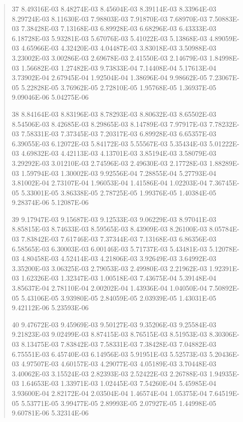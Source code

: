 \documentclass[letterpaper,10pt,english]{sphinxmanual}
\begin{document}
\begin{quote}
\begin{DUlineblock}{0em}
\item[] 37   8.49316E-03  8.48274E-03  8.45604E-03  8.39114E-03  8.33964E-03  8.29724E-03  8.11630E-03  7.98803E-03  7.91870E-03  7.68970E-03  7.50883E-03  7.38428E-03  7.13168E-03  6.89928E-03  6.68296E-03  6.43333E-03  6.18728E-03  5.93281E-03  5.67076E-03  5.41022E-03  5.13868E-03  4.89059E-03  4.65966E-03  4.32420E-03  4.04487E-03  3.83018E-03  3.50988E-03  3.23002E-03  3.00286E-03  2.69678E-03  2.41550E-03  2.14679E-03  1.84998E-03  1.56682E-03  1.27482E-03  9.73833E-04  7.14408E-04  5.17613E-04  3.73902E-04  2.67945E-04  1.92504E-04  1.38696E-04  9.98662E-05  7.23067E-05  5.22828E-05  3.76962E-05  2.72810E-05  1.95768E-05  1.36937E-05  9.09046E-06  5.04275E-06
\item[] 38   8.84164E-03  8.83196E-03  8.78293E-03  8.80632E-03  8.65502E-03  8.54506E-03  8.42685E-03  8.29865E-03  8.14789E-03  7.97917E-03  7.78232E-03  7.58331E-03  7.37345E-03  7.20317E-03  6.89928E-03  6.65357E-03  6.39055E-03  6.12072E-03  5.84172E-03  5.55567E-03  5.35434E-03  5.01222E-03  4.69832E-03  4.42113E-03  4.13701E-03  3.85194E-03  3.58079E-03  3.29292E-03  3.01210E-03  2.74596E-03  2.49630E-03  2.17728E-03  1.88289E-03  1.59794E-03  1.30002E-03  9.92556E-04  7.28855E-04  5.27793E-04  3.81002E-04  2.73107E-04  1.96053E-04  1.41586E-04  1.02203E-04  7.36745E-05  5.33001E-05  3.86338E-05  2.78725E-05  1.99376E-05  1.40384E-05  9.28374E-06  5.12087E-06
\item[] 39   9.17947E-03  9.15687E-03  9.12533E-03  9.06229E-03  8.97041E-03  8.85815E-03  8.74633E-03  8.59565E-03  8.43909E-03  8.26100E-03  8.05784E-03  7.83842E-03  7.61746E-03  7.37344E-03  7.13168E-03  6.86356E-03  6.58565E-03  6.30003E-03  6.00146E-03  5.71737E-03  5.43481E-03  5.12078E-03  4.80458E-03  4.52414E-03  4.21806E-03  3.92649E-03  3.64992E-03  3.35200E-03  3.06325E-03  2.79053E-03  2.49980E-03  2.21962E-03  1.92391E-03  1.62326E-03  1.32347E-03  1.00518E-03  7.43675E-04  5.39148E-04  3.85637E-04  2.78110E-04  2.00202E-04  1.43936E-04  1.04050E-04  7.50892E-05  5.43106E-05  3.93980E-05  2.84059E-05  2.03939E-05  1.43031E-05  9.42112E-06  5.23593E-06
\item[] 40   9.47672E-03  9.45969E-03  9.50127E-03  9.35206E-03  9.25584E-03  9.21823E-03  9.02499E-03  8.87415E-03  8.76515E-03  8.51953E-03  8.30306E-03  8.13475E-03  7.83842E-03  7.58331E-03  7.38428E-03  7.04882E-03  6.75551E-03  6.45740E-03  6.14956E-03  5.91951E-03  5.52573E-03  5.20436E-03  4.97507E-03  4.60157E-03  4.29077E-03  4.05189E-03  3.70448E-03  3.40062E-03  3.15524E-03  2.82393E-03  2.52422E-03  2.26788E-03  1.94935E-03  1.64653E-03  1.33971E-03  1.02445E-03  7.54260E-04  5.45985E-04  3.93600E-04  2.82172E-04  2.03504E-04  1.46574E-04  1.05375E-04  7.64519E-05  5.53771E-05  3.99477E-05  2.89993E-05  2.07927E-05  1.44998E-05  9.60781E-06  5.32314E-06

\end{DUlineblock}
\end{quote}
\end{document}
